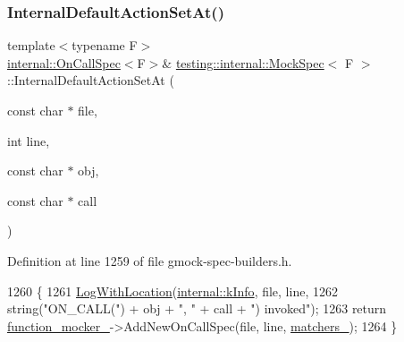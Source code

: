 \mbox{\label{classtesting_1_1internal_1_1MockSpec_a875c99443da1265604d87429693457f4}} 
\subsubsection{\texorpdfstring{Internal\+Default\+Action\+Set\+At()}{InternalDefaultActionSetAt()}}
{\footnotesize\ttfamily template$<$typename F$>$ \\
\hyperlink{classtesting_1_1internal_1_1OnCallSpec}{internal\+::\+On\+Call\+Spec}$<$F$>$\& \hyperlink{classtesting_1_1internal_1_1MockSpec}{testing\+::internal\+::\+Mock\+Spec}$<$ F $>$\+::Internal\+Default\+Action\+Set\+At (\begin{DoxyParamCaption}\item[{const char $\ast$}]{file,  }\item[{int}]{line,  }\item[{const char $\ast$}]{obj,  }\item[{const char $\ast$}]{call }\end{DoxyParamCaption})\hspace{0.3cm}{\ttfamily [inline]}}



Definition at line 1259 of file gmock-\/spec-\/builders.\+h.


\begin{DoxyCode}
1260                                                                      \{
1261     \hyperlink{namespacetesting_1_1internal_af271cd1fc0b62a7f4736cb3109e86a37}{LogWithLocation}(\hyperlink{namespacetesting_1_1internal_a203d1a8a2147a53d12bbdae40d443914a396aacfaee2849eaab7c1de9773d624d}{internal::kInfo}, file, line,
1262         \textcolor{keywordtype}{string}(\textcolor{stringliteral}{"ON\_CALL("}) + obj + \textcolor{stringliteral}{", "} + call + \textcolor{stringliteral}{") invoked"});
1263     \textcolor{keywordflow}{return} \hyperlink{classtesting_1_1internal_1_1MockSpec_a9dafaf30cc5ecfe824d1b92949e2054a}{function\_mocker\_}->AddNewOnCallSpec(file, line, 
      \hyperlink{classtesting_1_1internal_1_1MockSpec_acb32a52e9244cfc33601de0fcc96aa2f}{matchers\_});
1264   \}
\end{DoxyCode}
\mbox{\label{classtesting_1_1internal_1_1MockSpec_a503a434637634014b9bb6c5d68fd336c}} 
